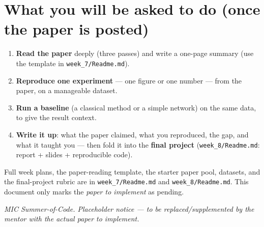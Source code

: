 \documentclass[11pt]{article}
\begin{document}
\section{What you will be asked to do (once the paper is posted)}

\begin{enumerate}[leftmargin=*,nosep]
  \item \textbf{Read the paper} deeply (three passes) and write a one-page summary
        (use the template in \texttt{week\_7/Readme.md}).
  \item \textbf{Reproduce one experiment} --- one figure or one number --- from the
        paper, on a manageable dataset.
  \item \textbf{Run a baseline} (a classical method or a simple network) on the
        same data, to give the result context.
  \item \textbf{Write it up}: what the paper claimed, what you reproduced, the gap,
        and what it taught you --- then fold it into the \textbf{final project}
        (\texttt{week\_8/Readme.md}: report + slides + reproducible code).
\end{enumerate}

\begin{keybox}
Full week plans, the paper-reading template, the starter paper pool, datasets,
and the final-project rubric are in \texttt{week\_7/Readme.md} and
\texttt{week\_8/Readme.md}. This document only marks the \emph{paper to implement}
as pending.
\end{keybox}

\vfill
\begin{center}\small\itshape
MIC Summer-of-Code. Placeholder notice --- to be replaced/supplemented by the
mentor with the actual paper to implement.
\end{center}
\end{document}
